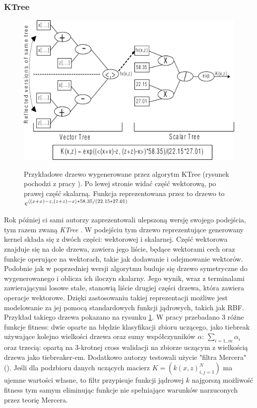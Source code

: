 \subsubsection{KTree}
\begin{figure}[h]
\centering
\includegraphics[scale=1.2]{figures/graphs/2-howley}
\label{fig:2-howley}
\caption{Przykładowe drzewo wygenerowane przez algorytm KTree (rysunek pochodzi z pracy \cite{Howley:2002:evolutionary}). Po  lewej stronie widać część wektorową, po prawej część skalarną. Funkcja reprezentowana przez to drzewo to $   e^{\langle (x+x)-z, (z+z)-x \rangle*58.35 / (22.15*27.01)} $}
\end{figure}
Rok później ci sami autorzy zaprezentowali ulepszoną wersję swojego podejścia, tym razem zwaną \emph{KTree} \cite{Howley:2002:evolutionary}. W podejściu tym drzewo reprezentujące generowany kernel składa się z dwóch części: wektorowej i skalarnej. Część wektorowa znajduje się na dole drzewa, zawiera jego liście, będące wektorami cech oraz funkcje operujące na wektorach, takie jak dodawanie i odejmowanie wektorów. Podobnie jak w poprzedniej wersji algorytmu buduje się drzewo symetryczne do wygenerowanego i oblicza ich iloczyn skalarny. Jego wynik, wraz z terminalami zawierającymi losowe stałe, stanowią liście drugiej części drzewa, która zawiera operacje wektorowe. Dzięki zastosowaniu takiej reprezentacji możliwe jest modelowanie za jej pomocą standardowych funkcji jądrowych, takich jak RBF. Przykład takiego drzewa pokazano na rysunku \ref{fig:2-howley}.
W pracy przebadano 3 różne funkcje fitness: dwie oparte na błędzie klasyfikacji zbioru uczącego, jako tiebreak używające kolejno wielkości drzewa oraz sumy współczynników $ \alpha $: $ \sum_{i=1..m}\alpha_i $ oraz trzecią: opartą na 3-krotnej cross walidacji na zbiorze uczącym z wielkością drzewa jako tiebreaker-em. Dodatkowo autorzy testowali użycie "filtra Mercera" (). Jeśli dla podzbioru danych uczących macierz $ K = (k(x,z)_{i,j=1}^N) $ ma ujemne wartości własne, to filtr przypisuje funkcji jądrowej $ k $ najgorszą możliwość fitness tym samym eliminując funkcje nie spełniające warunków narzuconych przez teorię Mercera.
